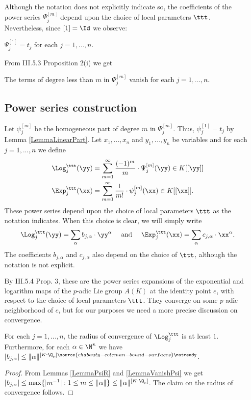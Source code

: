 Although the notation does not explicitly indicate so, the coefficients of the power series $\Psi^{[m]}_j$  depend upon the choice of local parameters $\ttt$. Nevertheless, since $[1]=\Id$ we observe:
\begin{lemma}
\notready\label{LemmaLinearPart} $\Psi^{[1]}_j =t_j$ for each $j=1,...,n$.
\end{lemma}
  From \cite{Bourbaki} III.5.3 Proposition 2(i) we get
\begin{lemma}
\notready\label{LemmaVanishPsi} The terms of degree less than $m$ in $\Psi^{[m]}_j$ vanish for each $j=1,...,n$.
\end{lemma}

\subsection{Power series construction} \label{SecLogExp2} Let $\psi^{[m]}_j$ be the homogeneous part of degree $m$ in $\Psi_j^{[m]}$. Thus, $\psi_j^{[1]} = t_j$ by Lemma \ref{LemmaLinearPart}. Let $x_1,...,x_n$ and $y_1,...,y_n$ be variables and for each $j=1,...,n$ we define
$$
\begin{aligned}
\Log^{\ttt}_j(\yy) & = \sum_{m=1}^\infty \frac{(-1)^m}{m}\cdot \Psi^{[m]}_j(\yy)\in K[[\yy]]\\
\Exp^{\ttt}_j(\xx) & = \sum_{m=1}^\infty \frac{1}{m!}\cdot \psi^{[m]}_j(\xx)\in K[[\xx]].
\end{aligned}
$$
These power series depend upon the choice of local parameters $\ttt$ as the notation indicates. When this choice is clear, we will simply write
$$
\Log^\ttt_j(\yy)=\sum_\alpha b_{j,\alpha}\cdot \yy^\alpha \quad \mbox{ and }\quad \Exp^\ttt_j(\xx)=\sum_\alpha c_{j,\alpha}\cdot \xx^\alpha.
$$
The coefficients $b_{j,\alpha}$ and $c_{j,\alpha}$ also depend on the choice of $\ttt$, although the notation is not explicit.

By \cite{Bourbaki} III.5.4 Prop. 3, these are the power series expansions of the exponential and logarithm maps of the $p$-adic Lie group $A(K)$ at the identity point $e$, with respect to the choice of local parameters $\ttt$. They converge on some $p$-adic neighborhood of $e$, but for our purposes we need a more precise discussion on convergence.


\begin{lemma}\label{LemmaCvLog} For each $j=1,...,n$, the radius of convergence of $\Log^{\ttt}_j$ is at least $1$. Furthermore, for each $\alpha\in \N^n$ we have $|b_{j,\alpha}|\le \|\alpha\|^{[K:\Q_p]
\source{chabauty-coleman-bound-surfaces}
\notready}$.
\end{lemma}
\begin{proof} From Lemmas \ref{LemmaPsiR} and \ref{LemmaVanishPsi} we get $|b_{j,\alpha}|\le \max\{ |m^{-1}|: 1\le m\le\|\alpha\|\} \le \|\alpha\|^{[K:\Q_p]}$. The claim on the radius of convergence follows.
\end{proof}


